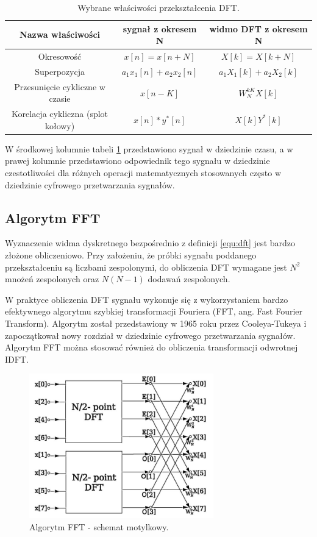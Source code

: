 \begin{table}[H]
	\caption{Wybrane właściwości przekształcenia DFT.}
	\centering
	\label{tab:dft_wlasc}
	\begin{tabular}{|c|c|c|}
		\hline 
		\textbf{Nazwa właściwości} & \textbf{sygnał z okresem N} & \textbf{widmo DFT z okresem N} 	\\
		\hline
		Okresowość					& $x[n] = x[n + N]$ 				& $X[k] = X[k + N]$ 				\\	\hline
		Superpozycja			& $a_{1}x_{1}[n] + a_{2}x_{2}[n]$			& $a_{1}X_{1}[k] + a_{2}X_{2}[k]$			\\	\hline
		Przesunięcie cykliczne w czasie			& $x[n-K]$			& $ W_{N}^{kK}X[k]$			\\	\hline
		Korelacja cykliczna (splot kołowy)		 				& $x[n]*y^{*}[n]$			& $X[k]Y^{*}[k]$			\\ 	\hline
	\end{tabular}
\end{table}
W środkowej kolumnie tabeli \ref{tab:dft_wlasc} przedstawiono sygnał w dziedzinie czasu, a w prawej kolumnie przedstawiono odpowiednik tego sygnału w dziedzinie czestotliwości dla różnych operacji matematycznych stosowanych często w dziedzinie cyfrowego przetwarzania sygnałów.

\subsection{Algorytm FFT}
Wyznaczenie widma dyskretnego bezpośrednio z definicji \ref{equ:dft} jest bardzo złożone obliczeniowo. Przy założeniu, że próbki sygnału poddanego przekształceniu są liczbami zespolonymi, do obliczenia DFT wymagane jest $N^{2}$ mnożeń zespolonych oraz $N(N-1)$ dodawań zespolonych.

W praktyce obliczenia DFT sygnału wykonuje się z wykorzystaniem bardzo efektywnego algorytmu szybkiej transformacji Fouriera (FFT, ang. Fast Fourier Transform). Algorytm został przedstawiony w 1965 roku przez Cooleya-Tukeya i zapoczątkował nowy rozdział w dziedzinie cyfrowego przetwarzania sygnałów. Algorytm FFT można stosować również do obliczenia transformacji odwrotnej IDFT.

\begin{figure}[H]
	\centering
	\includegraphics[width=8cm]{./grafiki/fft_motylki}
	\captionsetup{justification=centering}
	\caption{Algorytm FFT - schemat motylkowy.}
	\label{rys:fft_motyl}
\end{figure}

